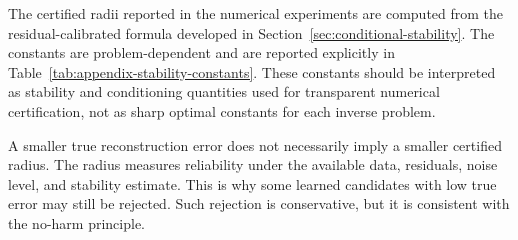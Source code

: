 \documentclass{article}
\numberwithin{equation}{section}
\theoremstyle{definition}
\begin{document}
The certified radii reported in the numerical experiments are computed from the residual-calibrated formula developed in Section~\ref{sec:conditional-stability}. The constants are problem-dependent and are reported explicitly in Table~\ref{tab:appendix-stability-constants}. These constants should be interpreted as stability and conditioning quantities used for transparent numerical certification, not as sharp optimal constants for each inverse problem.

A smaller true reconstruction error does not necessarily imply a smaller certified radius. The radius measures reliability under the available data, residuals, noise level, and stability estimate. This is why some learned candidates with low true error may still be rejected. Such rejection is conservative, but it is consistent with the no-harm principle.
\end{document}
